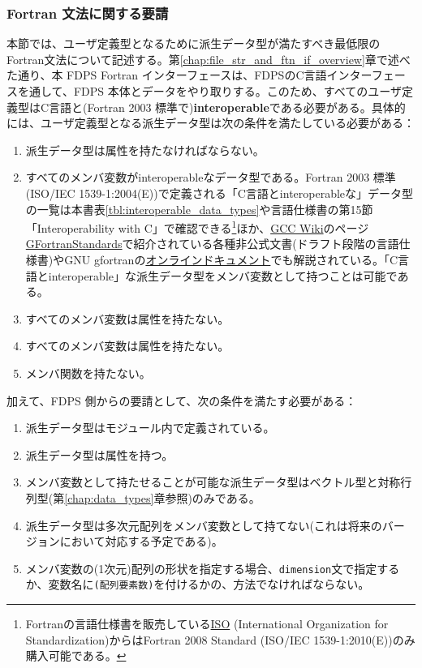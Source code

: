 \subsubsection{Fortran 文法に関する要請}
\label{s2sec:requirements_for_fortran_grammer}
本節では、ユーザ定義型となるために派生データ型が満たすべき最低限のFortran文法について記述する。第\ref{chap:file_str_and_ftn_if_overview}章で述べた通り、本 FDPS Fortran インターフェースは、FDPSのC言語インターフェースを通して、FDPS 本体とデータをやり取りする。このため、すべてのユーザ定義型はC言語と(Fortran 2003 標準で)\textbf{interoperable}である必要がある。具体的には、ユーザ定義型となる派生データ型は次の条件を満たしている必要がある：
\begin{enumerate}[leftmargin=*,itemsep=-1ex,label=(\arabic*)]
\item 派生データ型は属性を持たなければならない。
\item すべてのメンバ変数がinteroperableなデータ型である。Fortran 2003 標準(ISO/IEC 1539-1:2004(E))で定義される「C言語とinteroperableな」データ型の一覧は本書表\ref{tbl:interoperable_data_types}や言語仕様書の第15節「Interoperability with C」で確認できる\footnote{Fortranの言語仕様書を販売している\href{http://www.iso.org/iso/home.htm}{ISO} (International Organization for Standardization)からはFortran 2008 Standard (ISO/IEC 1539-1:2010(E))のみ購入可能である。}ほか、\href{https://gcc.gnu.org/wiki/HomePage}{GCC Wiki}のページ\href{https://gcc.gnu.org/wiki/GFortranStandards}{GFortranStandards}で紹介されている各種非公式文書(ドラフト段階の言語仕様書)やGNU gfortranの\href{https://gcc.gnu.org/onlinedocs/gfortran/ISO_005fC\_005fBINDING.html#ISO\_005fC\_005fBINDING}{オンラインドキュメント}でも解説されている。「C言語とinteroperable」な派生データ型をメンバ変数として持つことは可能である。
\item すべてのメンバ変数は属性を持たない。
\item すべてのメンバ変数は属性を持たない。
\item メンバ関数を持たない。
\end{enumerate}
加えて、FDPS 側からの要請として、次の条件を満たす必要がある：
\begin{enumerate}[leftmargin=*,itemsep=-1ex,label=(\arabic*),resume]
\item 派生データ型はモジュール内で定義されている。
\item 派生データ型は属性を持つ。
\item メンバ変数として持たせることが可能な派生データ型はベクトル型と対称行列型(第\ref{chap:data_types}章参照)のみである。
\item 派生データ型は多次元配列をメンバ変数として持てない(これは将来のバージョンにおいて対応する予定である)。
\item メンバ変数の(1次元)配列の形状を指定する場合、\texttt{dimension}文で指定するか、変数名に\texttt{(配列要素数)}を付けるかの、方法でなければならない。
\end{enumerate}
